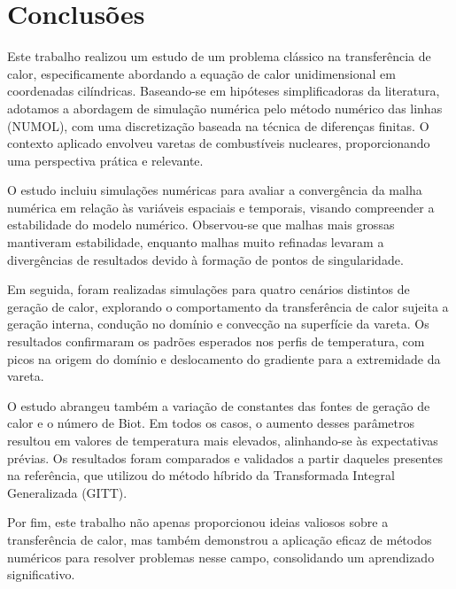 \chapter{Conclusões} \label{chap:conclusion}

Este trabalho realizou um estudo de um problema clássico na transferência de calor, especificamente abordando a equação de calor unidimensional em coordenadas cilíndricas. Baseando-se em hipóteses simplificadoras da literatura, adotamos a abordagem de simulação numérica pelo método numérico das linhas (NUMOL), com uma discretização baseada na técnica de diferenças finitas. O contexto aplicado envolveu varetas de combustíveis nucleares, proporcionando uma perspectiva prática e relevante.

O estudo incluiu simulações numéricas para avaliar a convergência da malha numérica em relação às variáveis espaciais e temporais, visando compreender a estabilidade do modelo numérico. Observou-se que malhas mais grossas mantiveram estabilidade, enquanto malhas muito refinadas levaram a divergências de resultados devido à formação de pontos de singularidade.

Em seguida, foram realizadas simulações para quatro cenários distintos de geração de calor, explorando o comportamento da transferência de calor sujeita a geração interna, condução no domínio e convecção na superfície da vareta. Os resultados confirmaram os padrões esperados nos perfis de temperatura, com picos na origem do domínio e deslocamento do gradiente para a extremidade da vareta.

O estudo abrangeu também a variação de constantes das fontes de geração de calor e o número de Biot. Em todos os casos, o aumento desses parâmetros resultou em valores de temperatura mais elevados, alinhando-se às expectativas prévias. Os resultados foram comparados e validados a partir daqueles presentes na referência, que utilizou do método híbrido da Transformada Integral Generalizada (GITT).

Por fim, este trabalho não apenas proporcionou ideias valiosos sobre a transferência de calor, mas também demonstrou a aplicação eficaz de métodos numéricos para resolver problemas nesse campo, consolidando um aprendizado significativo.